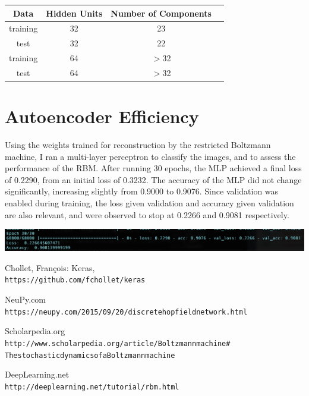 \documentclass[11pt]{amsart}
\theoremstyle{remark}
\theoremstyle{remark}
\numberwithin{equation}{section}
\begin{document}
\begin{center}
  \small
  \tabcolsep=0.11cm 
 \begin{tabular}{ |c|c|c|c| } 
       \hline
		Data & Hidden Units & Number of Components \\
		\hline
		training & 32 & 23 \\
		test & 32 & 22 \\
		training & 64 & $>$32 \\
		test & 64 & $>$32 \\
       \hline
 \end{tabular}
 \end{center}


\section{Autoencoder Efficiency}

Using the weights trained for reconstruction by the restricted Boltzmann machine, I ran a 
multi-layer perceptron to classify the images, and to assess the performance of the RBM. 
After running 30 epochs, the MLP achieved a final loss of 0.2290, from an initial loss of 
0.3232. The accuracy of the MLP did not change significantly, increasing slightly from 
0.9000 to 0.9076. Since validation was enabled during training, the loss given 
validation and accuracy given validation are also relevant, and were observed to 
stop at 0.2266 and 0.9081 respectively. 

\graphicspath{ {../Images/restrictedBM/} }
\begin{center}
 \includegraphics[width=1.25\textwidth]{scores.png}\hfill
\end{center}

\begin{thebibliography}{99}

Chollet, Fran\c{c}ois: Keras,
\\\texttt{https://github.com/fchollet/keras} 

NeuPy.com
\\\texttt{https://neupy.com/2015/09/20/discrete\textunderscore hopfield\textunderscore network.html}

Scholarpedia.org
\\\texttt{http://www.scholarpedia.org/article/Boltzmann\textunderscore machine\# The\textunderscore stochastic\textunderscore dynamics\textunderscore of\textunderscore a\textunderscore Boltzmann\textunderscore machine}

DeepLearning.net
\\\texttt{http://deeplearning.net/tutorial/rbm.html}

\end{thebibliography}
\end{document}
